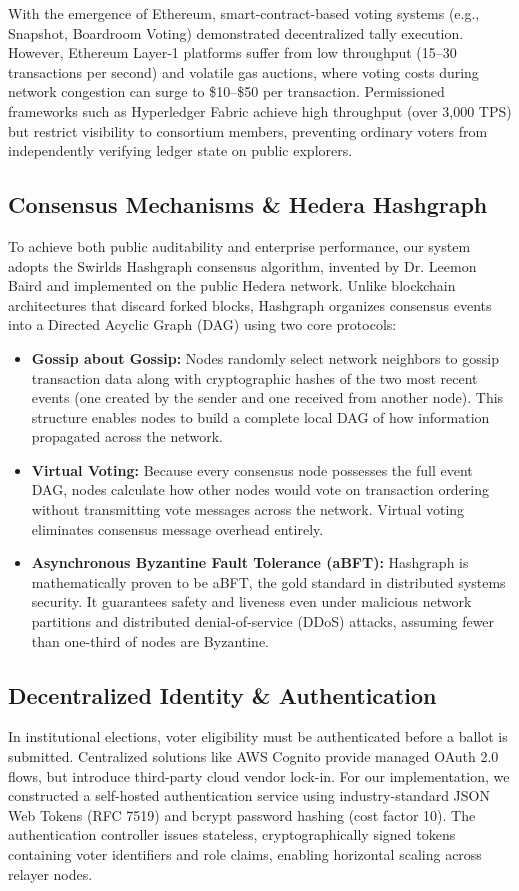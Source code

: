 \documentclass[12pt, a4paper]{article}
\begin{document}
With the emergence of Ethereum, smart-contract-based voting systems (e.g., Snapshot, Boardroom Voting) demonstrated decentralized tally execution. However, Ethereum Layer-1 platforms suffer from low throughput (15--30 transactions per second) and volatile gas auctions, where voting costs during network congestion can surge to \$10--\$50 per transaction. Permissioned frameworks such as Hyperledger Fabric achieve high throughput (over 3,000 TPS) but restrict visibility to consortium members, preventing ordinary voters from independently verifying ledger state on public explorers.

\subsection{Consensus Mechanisms \& Hedera Hashgraph}
To achieve both public auditability and enterprise performance, our system adopts the Swirlds Hashgraph consensus algorithm, invented by Dr. Leemon Baird and implemented on the public Hedera network. Unlike blockchain architectures that discard forked blocks, Hashgraph organizes consensus events into a Directed Acyclic Graph (DAG) using two core protocols:
\begin{itemize}[leftmargin=*]
    \item \textbf{Gossip about Gossip:} Nodes randomly select network neighbors to gossip transaction data along with cryptographic hashes of the two most recent events (one created by the sender and one received from another node). This structure enables nodes to build a complete local DAG of how information propagated across the network.
    \item \textbf{Virtual Voting:} Because every consensus node possesses the full event DAG, nodes calculate how other nodes would vote on transaction ordering without transmitting vote messages across the network. Virtual voting eliminates consensus message overhead entirely.
    \item \textbf{Asynchronous Byzantine Fault Tolerance (aBFT):} Hashgraph is mathematically proven to be aBFT, the gold standard in distributed systems security. It guarantees safety and liveness even under malicious network partitions and distributed denial-of-service (DDoS) attacks, assuming fewer than one-third of nodes are Byzantine.
\end{itemize}

\subsection{Decentralized Identity \& Authentication}
In institutional elections, voter eligibility must be authenticated before a ballot is submitted. Centralized solutions like AWS Cognito provide managed OAuth 2.0 flows, but introduce third-party cloud vendor lock-in. For our implementation, we constructed a self-hosted authentication service using industry-standard JSON Web Tokens (RFC 7519) and bcrypt password hashing (cost factor 10). The authentication controller issues stateless, cryptographically signed tokens containing voter identifiers and role claims, enabling horizontal scaling across relayer nodes.
\end{document}
